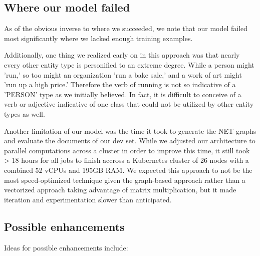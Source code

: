 \documentclass[11pt,a4paper]{article}
\begin{document}
\subsection{Where our model failed}

As of the obvious inverse to where we succeeded, we note that our model failed most significantly where we lacked enough training examples.

Additionally, one thing we realized early on in this approach was that nearly every other entity type is personified to an extreme degree. While a person might 'run,' so too might an organization 'run a bake sale,' and a work of art might 'run up a high price.' Therefore the verb of running is not so indicative of a 'PERSON' type as we initially believed. In fact, it is difficult to conceive of a verb or adjective indicative of one class that could not be utilized by other entity types as well.

Another limitation of our model was the time it took to generate the NET graphs and evaluate the documents of our dev set. While we adjusted our architecture to parallel computations across a cluster in order to improve this time, it still took > 18 hours for all jobs to finish accross a Kubernetes cluster of 26 nodes with a combined 52 vCPUs and 195GB RAM. We expected this approach to not be the most speed-optimized technique given the graph-based approach rather than a vectorized approach taking advantage of matrix multiplication, but it made iteration and experimentation slower than anticipated.

\subsection{Possible enhancements} \label{enhancements}

Ideas for possible enhancements include:
\end{document}
